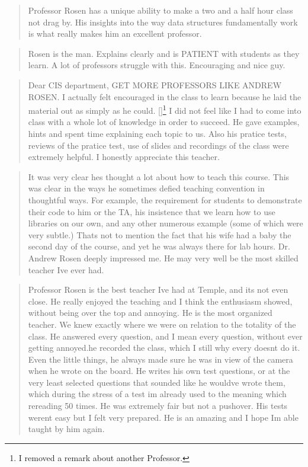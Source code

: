 \documentclass[10pt]{article}
\begin{document}
\begin{small}
\begin{quotation}
\end{quotation}
	
	
\begin{quotation}
	Professor Rosen has a unique ability to make a two and a half hour class not drag by. His insights into the way data structures fundamentally work is what really makes him an excellent professor.
	
\end{quotation}


\begin{quotation}
	Rosen is the man. Explains clearly and is PATIENT with students as they learn. A lot of professors struggle with this. Encouraging and nice guy.
\end{quotation}

\begin{quotation}
	Dear CIS department, GET MORE PROFESSORS LIKE ANDREW ROSEN. I actually felt encouraged in the class to learn because he laid the material out as simply as he could. [\textellipsis]\footnote{I removed a remark about another Professor.} I did not feel like I had to come into class with a whole lot of knowledge in order to succeed. He gave examples, hints and spent time explaining each topic to us.  Also his pratice tests, reviews of the pratice test, use of slides and recordings of the class were extremely helpful. I honestly appreciate this teacher.
	
\end{quotation}

\begin{quotation}
	It was very clear hes thought a lot about how to teach this course. This was clear in the ways he sometimes defied teaching convention in thoughtful ways. For example, the requirement for students to demonstrate their code to him or the TA, his insistence that we learn how to use libraries on our own, and any other numerous example (some of which were very subtle.) Thats not to mention the fact that his wife had a baby the second day of the course, and yet he was always there for lab hours. Dr. Andrew Rosen deeply impressed me. He may very well be the most skilled teacher Ive ever had.
	
\end{quotation}

\begin{quotation}
	Professor Rosen is the best teacher Ive had at Temple, and its not even close. He really enjoyed the teaching and I think the enthusiasm showed, without being over the top and annoying. He is the most organized teacher. We knew exactly where we were on relation to the totality of the class. He answered every question, and I mean every question, without ever getting annoyed.he recorded the class, which I still why every doesnt do it. Even the little things, he always made sure he was in view of the camera when he wrote on the board. He writes his own test questions, or at the very least selected questions that sounded like he wouldve wrote them, which during the stress of a test im already used to the meaning which rereading 50 times. He was extremely fair but not a pushover. His tests werent easy but I felt very prepared. He is an amazing and I hope Im able taught by him again.
	

\end{quotation}
\end{small}
\end{document}
